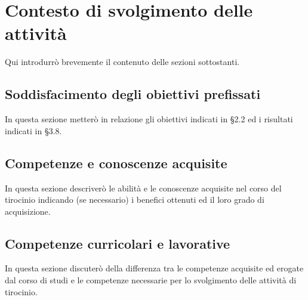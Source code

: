 \chapter{Contesto di svolgimento delle attività}
\label{cap:resoconto}
Qui introdurrò brevemente il contenuto delle sezioni sottostanti.

\section{Soddisfacimento degli obiettivi prefissati}

In questa sezione metterò in relazione gli obiettivi indicati in §2.2 ed i risultati indicati in §3.8.

\section{Competenze e conoscenze acquisite}

In questa sezione descriverò le abilità e le conoscenze acquisite nel corso del tirocinio indicando (se necessario) i benefici ottenuti ed il loro grado di acquisizione.

\section{Competenze curricolari e lavorative}

In questa sezione discuterò della differenza tra le competenze acquisite ed erogate dal corso di studi e le competenze necessarie per lo svolgimento delle attività di tirocinio.
